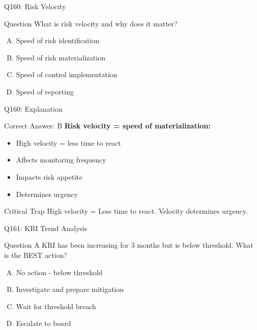 \documentclass{beamer}
\begin{document}
	\begin{frame}{Q160: Risk Velocity}
		\begin{block}{Question}
			What is risk velocity and why does it matter?
		\end{block}
		\begin{enumerate}[(A)]
			\item Speed of risk identification
			\item Speed of risk materialization
			\item Speed of control implementation
			\item Speed of reporting
		\end{enumerate}
	\end{frame}
	
	\begin{frame}{Q160: Explanation}
		\begin{block}{Correct Answer: B}
			\textbf{Risk velocity = speed of materialization:}
			\begin{itemize}
				\item High velocity = less time to react
				\item Affects monitoring frequency
				\item Impacts risk appetite
				\item Determines urgency
			\end{itemize}
		\end{block}
		\begin{alertblock}{Critical Trap}
			High velocity = Less time to react.
			Velocity determines urgency.
		\end{alertblock}
	\end{frame}
	
	
	\begin{frame}{Q161: KRI Trend Analysis}
		\begin{block}{Question}
			A KRI has been increasing for 3 months but is below threshold. What is the BEST action?
		\end{block}
		\begin{enumerate}[(A)]
			\item No action - below threshold
			\item Investigate and prepare mitigation
			\item Wait for threshold breach
			\item Escalate to board
		\end{enumerate}
	\end{frame}
	
\end{document}
